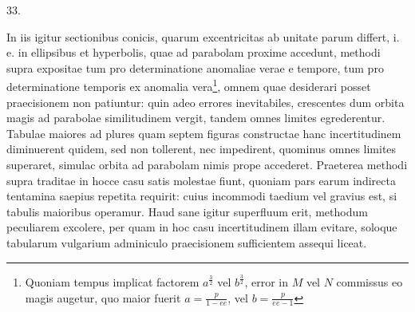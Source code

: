 \begin{center}
\hypertarget{native-051-article033}{}33.
\end{center}
In iis igitur sectionibus conicis, quarum excentricitas ab unitate parum differt, i. e. in ellipsibus et hyperbolis, quae ad parabolam proxime accedunt, methodi supra expositae tum pro determinatione anomaliae verae e tempore, tum pro determinatione temporis ex anomalia vera\footnote{Quoniam tempus implicat factorem $a^{\frac{3}{2}}$ vel $b^{\frac{3}{2}}$, error in $M$ vel $N$ commissus eo magis augetur, quo maior fuerit $a=\frac{p}{1-ee}$, vel $b=\frac{p}{ee-1}$}, omnem quae desiderari posset praecisionem non patiuntur: quin adeo errores inevitabiles, crescentes dum orbita magis ad parabolae similitudinem vergit, tandem omnes limites egrederentur. Tabulae maiores ad plures quam septem figuras constructae hanc incertitudinem diminuerent quidem, sed non tollerent, nec impedirent, quominus omnes limites superaret, simulac orbita ad parabolam nimis prope accederet. Praeterea methodi supra traditae in hocce casu satis molestae fiunt, quoniam pars earum indirecta tentamina saepius repetita requirit: cuius incommodi taedium vel gravius est, si tabulis maioribus operamur. Haud sane igitur superfluum erit, methodum peculiarem excolere, per quam in hoc casu incertitudinem illam evitare, soloque tabularum vulgarium adminiculo praecisionem sufficientem assequi liceat.

